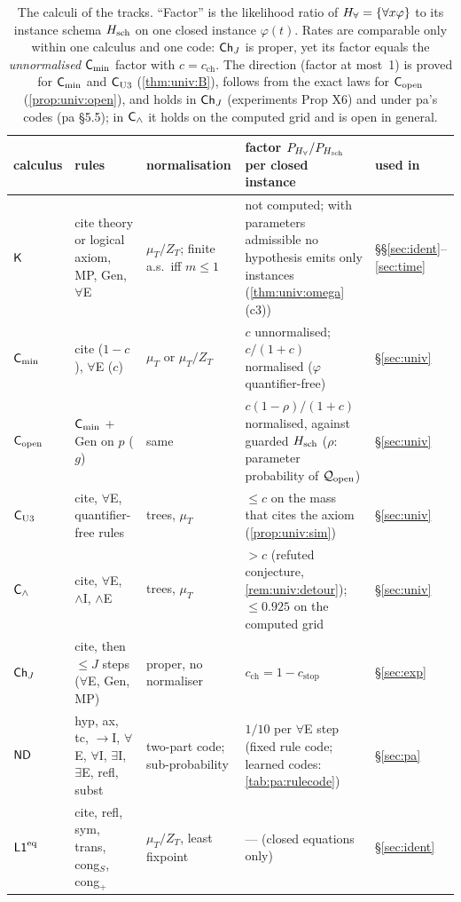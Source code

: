 \begin{table}[t]
\centering\footnotesize
\begin{tabularx}{\textwidth}{@{}l>{\raggedright\arraybackslash}p{3.3cm}>{\raggedright\arraybackslash}p{2.4cm}>{\raggedright\arraybackslash}X>{\raggedright\arraybackslash}p{1.3cm}@{}}
\toprule
calculus & rules & normalisation & factor $P_{H_{\forall}}/P_{H_{\mathrm{sch}}}$ per closed instance & used in\\
\midrule
$\mathsf{K}$ & cite theory or logical axiom, MP, Gen, $\forall$E & $\mu_T/Z_T$; finite a.s.\ iff $m\le1$ & not computed; with parameters admissible no hypothesis emits only instances (\cref{thm:univ:omega}(c3)) & \S\S\ref{sec:ident}--\ref{sec:time}\\
$\mathsf{C}_{\min}$ & cite ($1-c$), $\forall$E ($c$) & $\mu_T$ or $\mu_T/Z_T$ & $c$ unnormalised; $c/(1+c)$ normalised ($\varphi$ quantifier-free) & \S\ref{sec:univ}\\
$\mathsf{C}_{\mathrm{open}}$ & $\mathsf{C}_{\min}$ + Gen on $p$ ($g$) & same & $c(1-\rho)/(1+c)$ normalised, against guarded $H_{\mathrm{sch}}$ ($\rho$: parameter probability of $\mathcal{Q}_{\mathrm{open}}$) & \S\ref{sec:univ}\\
$\mathsf{C}_{\mathrm{U3}}$ & cite, $\forall$E, quantifier-free rules & trees, $\mu_T$ & $\le c$ on the mass that cites the axiom (\cref{prop:univ:sim}) & \S\ref{sec:univ}\\
$\mathsf{C}_{\wedge}$ & cite, $\forall$E, $\wedge$I, $\wedge$E & trees, $\mu_T$ & $>c$ (refuted conjecture, \cref{rem:univ:detour}); $\le0.925$ on the computed grid & \S\ref{sec:univ}\\
$\mathsf{Ch}_{J}$ & cite, then $\le J$ steps ($\forall$E, Gen, MP) & proper, no normaliser & $c_{\mathrm{ch}}=1-c_{\mathrm{stop}}$ & \S\ref{sec:exp}\\
$\mathsf{ND}$ & hyp, ax, tc, $\to$I, $\forall$E, $\forall$I, $\exists$I, $\exists$E, refl, subst & two-part code; sub-probability & $1/10$ per $\forall$E step (fixed rule code; learned codes: \cref{tab:pa:rulecode}) & \S\ref{sec:pa}\\
$\mathord{\mathsf{L1}}^{\mathrm{eq}}$ & cite, refl, sym, trans, cong$_S$, cong$_+$ & $\mu_T/Z_T$, least fixpoint & --- (closed equations only) & \S\ref{sec:ident}\\
\bottomrule
\end{tabularx}
\caption{The calculi of the tracks. ``Factor'' is the likelihood ratio of $H_{\forall}=\{\forall x\varphi\}$ to its instance schema $H_{\mathrm{sch}}$ on one closed instance $\varphi(t)$. Rates are comparable only within one calculus and one code: $\mathsf{Ch}_{J}$ is proper, yet its factor equals the \emph{unnormalised} $\mathsf{C}_{\min}$ factor with $c=c_{\mathrm{ch}}$. The direction (factor at most~1) is proved for $\mathsf{C}_{\min}$ and $\mathsf{C}_{\mathrm{U3}}$ (\cref{thm:univ:B}), follows from the exact laws for $\mathsf{C}_{\mathrm{open}}$ (\cref{prop:univ:open}), and holds in $\mathsf{Ch}_{J}$ (experiments Prop X6) and under pa's codes (pa \S5.5); in $\mathsf{C}_{\wedge}$ it holds on the computed grid and is open in general.}
\label{tab:model:calculi}
\end{table}

